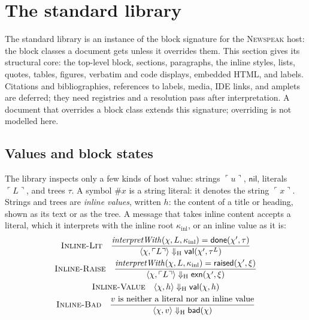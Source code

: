 \documentclass[11pt]{article}
\numberwithin{equation}{section}
\newcommand{\NS}{\textsc{Newspeak}}
\newcommand{\kw}[1]{\ensuremath{\mathsf{#1}}}
\newcommand{\rulelabel}[1]{\textsc{#1}}
\begin{document}
\section{The standard library}
\label{sec:library}

The standard library is an instance of the block signature for the \NS{}
host: the block classes a document gets unless it overrides them.  This
section gives its structural core: the top-level block, sections,
paragraphs, the inline styles, lists, quotes, tables, figures, verbatim and
code displays, embedded HTML, and labels.  Citations and bibliographies,
references to labels, media, IDE links, and amplets are deferred; they need
registries and a resolution pass after interpretation.  A document that
overrides a block class extends this signature; overriding is not modelled
here.

\subsection{Values and block states}

The library inspects only a few kinds of host value: strings $\ulcorner u
\urcorner$, $\kw{nil}$, literals $\ulcorner L \urcorner$, and trees
$\tau$.  A symbol $\#x$ is a string literal: it denotes the string
$\ulcorner x \urcorner$.  Strings and trees are \emph{inline values},
written $h$: the content of a title or heading, shown as its text or as the
tree.  A message that takes inline content accepts a literal, which it
interprets with the inline root $\kappa_{\mathrm{inl}}$, or an inline value
as it is:
\begin{gather}
\label{eq:lib-inline-lit}
\rulelabel{Inline-Lit}\quad
\frac{\mathit{interpretWith}(\chi, L, \kappa_{\mathrm{inl}}) =
        \kw{done}(\chi', \tau)}
     {\langle \chi, \ulcorner L \urcorner \rangle \Downarrow_{\mathrm{H}}
        \kw{val}(\chi', \tau^{L})}
\\
\label{eq:lib-inline-raise}
\rulelabel{Inline-Raise}\quad
\frac{\mathit{interpretWith}(\chi, L, \kappa_{\mathrm{inl}}) =
        \kw{raised}(\chi', \xi)}
     {\langle \chi, \ulcorner L \urcorner \rangle \Downarrow_{\mathrm{H}}
        \kw{exn}(\chi', \xi)}
\\
\label{eq:lib-inline-value}
\rulelabel{Inline-Value}\quad
\langle \chi, h \rangle \Downarrow_{\mathrm{H}} \kw{val}(\chi, h)
\\
\label{eq:lib-inline-bad}
\rulelabel{Inline-Bad}\quad
\frac{v \text{ is neither a literal nor an inline value}}
     {\langle \chi, v \rangle \Downarrow_{\mathrm{H}} \kw{bad}(\chi)}
\end{gather}
\end{document}
